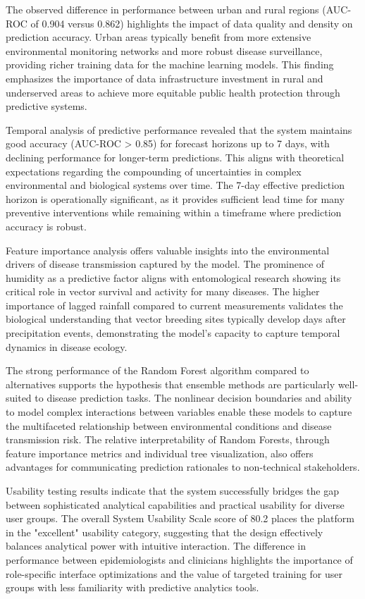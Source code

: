 \documentclass[12pt,a4paper]{report}
\begin{document}
The observed difference in performance between urban and rural regions (AUC-ROC of 0.904 versus 0.862) highlights the impact of data quality and density on prediction accuracy. Urban areas typically benefit from more extensive environmental monitoring networks and more robust disease surveillance, providing richer training data for the machine learning models. This finding emphasizes the importance of data infrastructure investment in rural and underserved areas to achieve more equitable public health protection through predictive systems.

Temporal analysis of predictive performance revealed that the system maintains good accuracy (AUC-ROC > 0.85) for forecast horizons up to 7 days, with declining performance for longer-term predictions. This aligns with theoretical expectations regarding the compounding of uncertainties in complex environmental and biological systems over time. The 7-day effective prediction horizon is operationally significant, as it provides sufficient lead time for many preventive interventions while remaining within a timeframe where prediction accuracy is robust.

Feature importance analysis offers valuable insights into the environmental drivers of disease transmission captured by the model. The prominence of humidity as a predictive factor aligns with entomological research showing its critical role in vector survival and activity for many diseases. The higher importance of lagged rainfall compared to current measurements validates the biological understanding that vector breeding sites typically develop days after precipitation events, demonstrating the model's capacity to capture temporal dynamics in disease ecology.

The strong performance of the Random Forest algorithm compared to alternatives supports the hypothesis that ensemble methods are particularly well-suited to disease prediction tasks. The nonlinear decision boundaries and ability to model complex interactions between variables enable these models to capture the multifaceted relationship between environmental conditions and disease transmission risk. The relative interpretability of Random Forests, through feature importance metrics and individual tree visualization, also offers advantages for communicating prediction rationales to non-technical stakeholders.

Usability testing results indicate that the system successfully bridges the gap between sophisticated analytical capabilities and practical usability for diverse user groups. The overall System Usability Scale score of 80.2 places the platform in the "excellent" usability category, suggesting that the design effectively balances analytical power with intuitive interaction. The difference in performance between epidemiologists and clinicians highlights the importance of role-specific interface optimizations and the value of targeted training for user groups with less familiarity with predictive analytics tools.
\end{document}
